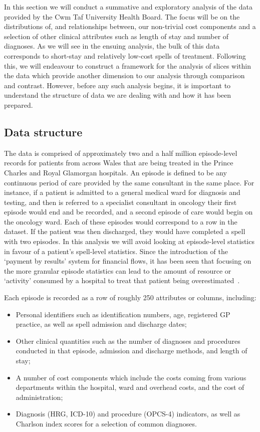 In this section we will conduct a summative and exploratory analysis of the data
provided by the Cwm Taf University Health Board. The focus will be on the
distributions of, and relationships between, our non-trivial cost components
and a selection of other clinical attributes such as length of stay and number
of diagnoses. As we will see in the ensuing analysis, the bulk of this data
corresponds to short-stay and relatively low-cost spells of treatment. Following
this, we will endeavour to construct a framework for the analysis of slices
within the data which provide another dimension to our analysis through
comparison and contrast. However, before any such analysis begins, it is
important to understand the structure of data we are dealing with and how it has
been prepared.

\subsection{Data structure}\label{subsec:structure}

The data is comprised of approximately two and a half million episode-level
records for patients from across Wales that are being treated in the Prince
Charles and Royal Glamorgan hospitals. An episode is defined to be any
continuous period of care provided by the same consultant in the same place. For
instance, if a patient is admitted to a general medical ward for diagnosis and
testing, and then is referred to a specialist consultant in oncology their first
episode would end and be recorded, and a second episode of care would begin on
the oncology ward. Each of these episodes would correspond to a row in the
dataset. If the patient was then discharged, they would have completed a spell
with two episodes. In this analysis we will avoid looking at episode-level
statistics in favour of a patient's spell-level statistics. Since the
introduction of the `payment by results' system for financial flows, it has been
seen that focusing on the more granular episode statistics can lead to the
amount of resource or `activity' consumed by a hospital to treat that patient
being overestimated~\cite{BMJ2004}.

Each episode is recorded as a row of roughly 250 attributes or columns,
including:

\begin{itemize}
    \item Personal identifiers such as identification numbers, age, registered
        GP practice, as well as spell admission and discharge dates;
    \item Other clinical quantities such as the number of diagnoses and
        procedures conducted in that episode, admission and discharge methods,
        and length of stay;
    \item A number of cost components which include the costs coming from
        various departments within the hospital, ward and overhead costs, and
        the cost of administration;
    \item Diagnosis (HRG, ICD-10) and procedure (OPCS-4) indicators, as well as
        Charlson index scores for a selection of common diagnoses.
\end{itemize}

